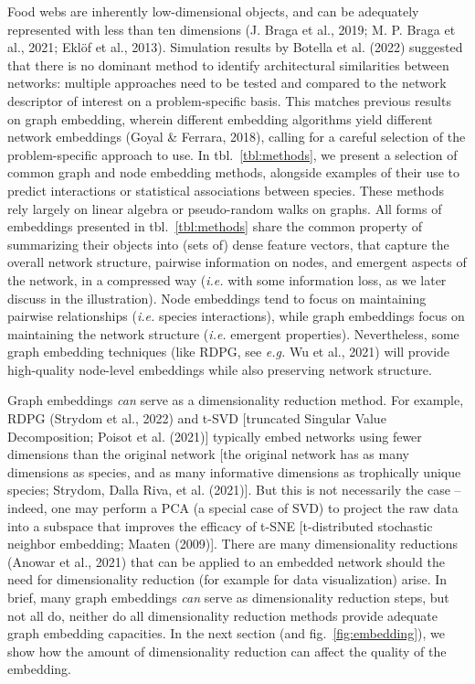 \documentclass[11pt]{article}
\begin{document}
Food webs are inherently low-dimensional objects, and can be adequately
represented with less than ten dimensions (J. Braga et al., 2019; M. P.
Braga et al., 2021; Eklöf et al., 2013). Simulation results by Botella
et al. (2022) suggested that there is no dominant method to identify
architectural similarities between networks: multiple approaches need to
be tested and compared to the network descriptor of interest on a
problem-specific basis. This matches previous results on graph
embedding, wherein different embedding algorithms yield different
network embeddings (Goyal \& Ferrara, 2018), calling for a careful
selection of the problem-specific approach to use. In
tbl.~\ref{tbl:methods}, we present a selection of common graph and node
embedding methods, alongside examples of their use to predict
interactions or statistical associations between species. These methods
rely largely on linear algebra or pseudo-random walks on graphs. All
forms of embeddings presented in tbl.~\ref{tbl:methods} share the common
property of summarizing their objects into (sets of) dense feature
vectors, that capture the overall network structure, pairwise
information on nodes, and emergent aspects of the network, in a
compressed way (\emph{i.e.} with some information loss, as we later
discuss in the illustration). Node embeddings tend to focus on
maintaining pairwise relationships (\emph{i.e.} species interactions),
while graph embeddings focus on maintaining the network structure
(\emph{i.e.} emergent properties). Nevertheless, some graph embedding
techniques (like RDPG, see \emph{e.g.} Wu et al., 2021) will provide
high-quality node-level embeddings while also preserving network
structure.

Graph embeddings \emph{can} serve as a dimensionality reduction method.
For example, RDPG (Strydom et al., 2022) and t-SVD {[}truncated Singular
Value Decomposition; Poisot et al. (2021){]} typically embed networks
using fewer dimensions than the original network {[}the original network
has as many dimensions as species, and as many informative dimensions as
trophically unique species; Strydom, Dalla Riva, et al. (2021){]}. But
this is not necessarily the case -- indeed, one may perform a PCA (a
special case of SVD) to project the raw data into a subspace that
improves the efficacy of t-SNE {[}t-distributed stochastic neighbor
embedding; Maaten (2009){]}. There are many dimensionality reductions
(Anowar et al., 2021) that can be applied to an embedded network should
the need for dimensionality reduction (for example for data
visualization) arise. In brief, many graph embeddings \emph{can} serve
as dimensionality reduction steps, but not all do, neither do all
dimensionality reduction methods provide adequate graph embedding
capacities. In the next section (and fig.~\ref{fig:embedding}), we show
how the amount of dimensionality reduction can affect the quality of the
embedding.
\end{document}
